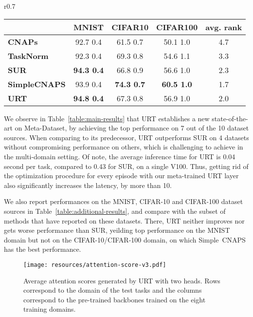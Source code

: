 \documentclass{article}
\begin{document}
\begin{wraptable}{r}{0.7\textwidth}
\centering
\setlength{\tabcolsep}{2.5pt}
\caption{
Test performance (mean+CI\%95) over 600 few-shot tasks on additional datasets.
}
\vspace{0.5em}
\begin{tabular}{lcccc}
\toprule
& \textbf{MNIST} & \textbf{CIFAR10} & \textbf{CIFAR100} & \textbf{avg. rank} \\
\midrule
\textbf{CNAPs}\cite{requeima2019fast} & 92.7  0.4 & 61.5  0.7 & 50.1  1.0 & 4.7 \\
\textbf{TaskNorm}\cite{bronskill2020tasknorm} & 92.3  0.4 & 69.3  0.8 & 54.6  1.1 & 3.3 \\
\textbf{SUR}\cite{dvornik2020selecting} & {\bf94.3  0.4} & 66.8  0.9 & 56.6  1.0 & 2.3  \\
\textbf{SimpleCNAPS}\cite{bateni2020improved} & 93.9  0.4 & \textbf{74.3  0.7} & \textbf{60.5  1.0} & 1.7 \\
\textbf{URT} & {\textbf{94.8  0.4}} & 67.3  0.8 & 56.9  1.0 & 2.0\\


   
   
\bottomrule
\end{tabular}
\label{table:additional-results}
\end{wraptable}

We observe in Table~\ref{table:main-results} that URT establishes a new state-of-the-art on Meta-Dataset, by achieving the top performance on 7 out of the 10 dataset sources. When comparing to its predecessor, URT outperforms SUR on 4 datasets without compromising performance on others, which is challenging to achieve in the multi-domain setting.
Of note, the average inference time for URT is 0.04 second per task, compared to 0.43 for SUR, on a single V100. Thus, getting rid of the optimization procedure for every episode with our meta-trained URT layer also significantly increases the latency, by more than 10.

We also report performances on the MNIST, CIFAR-10 and CIFAR-100 dataset sources in Table~\ref{table:additional-results}, and compare with the subset of methods that have reported on these datasets. There, URT neither improves nor gets worse performance than SUR, yeilding top performance on the MNIST domain but not on the CIFAR-10/CIFAR-100 domain, on which Simple~CNAPS has the best performance.



\begin{figure}[t!]
\begin{center}
\texttt{[image: resources/attention-score-v3.pdf]}
\end{center}
\caption{
Average attention scores generated by URT with two heads. 
Rows correspond to the domain of the test tasks and the columns correspond to the pre-trained backbones  trained on the eight training domains.}
\label{fig:attention-score}
\end{figure}
\end{document}
